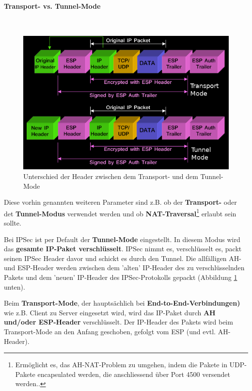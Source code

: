 \documentclass[a4paper, 11pt]{article}
\begin{document}
\newpage

\paragraph{Transport- vs. Tunnel-Mode}\mbox{} \\
\begin{figure}
	\centering
	\includegraphics[keepaspectratio=true,height=12\baselineskip]{tunnelvstransport.png}
	\caption{Unterschied der Header zwischen dem Transport- und dem Tunnel-Mode}
	\label{fig:tunneltransport}
\end{figure}

Diese vorhin genannten weiteren Parameter sind z.B. ob der \textbf{Transport-} oder det \textbf{Tunnel-Modus} verwendet werden und ob \textbf{NAT-Traversal}\footnote{Ermöglicht es, das AH-NAT-Problem zu umgehen, indem die Pakete in UDP-Pakete encapsulated werden, die anschliessend über Port 4500 versendet werden..} erlaubt sein sollte.

Bei IPSec ist per Default der \textbf{Tunnel-Mode} eingestellt. In diesem Modus wird das \textbf{gesamte IP-Paket verschlüsselt}. IPSec nimmt es, verschlüsselt es, packt seinen IPSec Header davor und schickt es durch den Tunnel. Die allfälligen AH- und ESP-Header werden zwischen dem 'alten' IP-Header des zu verschlüsselnden Pakets und dem 'neuen' IP-Header des IPSec-Protokolls gepackt (Abbildung \ref{fig:tunneltransport} unten). 

Beim \textbf{Transport-Mode}, der hauptsächlich bei \textbf{End-to-End-Verbindungen)} wie z.B. Client zu Server eingesetzt wird, wird das IP-Paket durch \textbf{AH und/oder ESP-Header} verschlüsselt. Der IP-Header des Pakets wird beim Transport-Mode an den Anfang geschoben, gefolgt vom ESP (und evtl. AH-Header).
\end{document}
